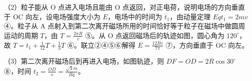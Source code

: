 \documentclass[\gkver]{gaokaozhenti}
\begin{document}
\begin{enumerate}
{

（2）粒子能从 O 点进入电场且能由 O 点返回，对正电荷，说明电场的方向垂直于 OC 向左，设电场强度大小为 $E$，电场中的时间为 $t_{1}$，由动量定理 $Eqt_{1}=2mv$ ④。粒子从 A 点射入到第二次离开磁场所用的时间恰好等于粒子在磁场中做圆周运动的周期 $T$，由 $T=\frac{2\pi R}{v}$ ⑤。从 O 点返回磁场后的轨迹如图，圆心角为 $120^{\circ}$，故 $T=t_{1}+\frac{1}{12}T+\frac{1}{3}T$ ⑥。联立②④⑤⑥解得 $E=\frac{12Bv}{7\pi}$ ⑦，方向垂直于 OC 向左。


（3）第二次离开磁场后到再进入电场，如图轨迹，则 $DF=OD=2R\cos30^{\circ}$ ⑧，时间 $t_{2}=\frac{OD}{v}=\frac{\sqrt{3}m}{Bq}$。

}

\end{enumerate}
\end{document}
